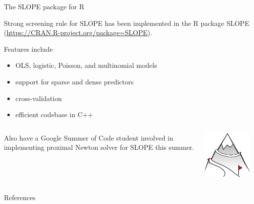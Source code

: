 \documentclass[10pt,ignorenonframetext]{beamer}
\newif\ifbibliography
\newcommand{\pkg}[1]{\textsf{#1}}
\begin{document}
\begin{frame}{The SLOPE package for R}

  Strong screening rule for SLOPE has been implemented in the R package SLOPE
  (\url{https://CRAN.R-project.org/package=SLOPE}). \medskip

  Features include
  \begin{itemize}
    \item OLS, logistic, Poisson, and multinomial models
    \item support for sparse and dense predictors
    \item cross-validation
    \item efficient codebase in \pkg{C++}
  \end{itemize}
  \begin{columns}[T]
    \begin{column}{0.65\linewidth}
      Also have a Google Summer of Code student involved in implementing
      proximal Newton solver for SLOPE this summer.
    \end{column}
    \begin{column}{0.25\linewidth}
      \begin{center}
        \includegraphics[width=\linewidth]{figures/logo.pdf}
      \end{center}
    \end{column}
  \end{columns}
\end{frame}

\begin{frame}[allowframebreaks]{References}
  \bibliographytrue
  \printbibliography[heading=none]
\end{frame}
\end{document}
